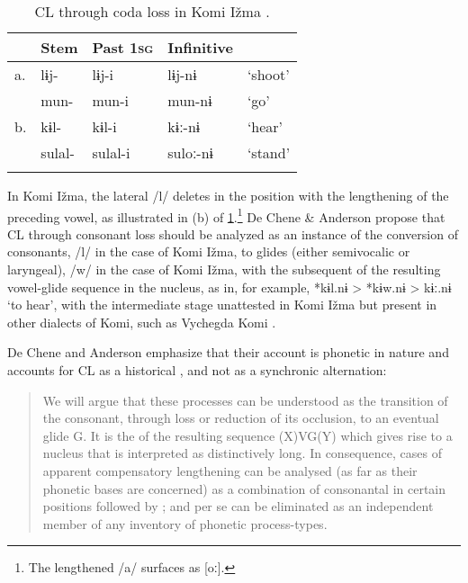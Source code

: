\documentclass[output=paper,
modfonts
]{LSP/langsci}
\begin{document}
\begin{table}
\begin{tabular}{lllll}
	\lsptoprule
	&  Stem & Past \textsc{1sg} & Infinitive & \\
	\midrule
	a. & lɨj- & lɨj-i & lɨj-nɨ & `shoot' \\
	& mun- & mun-i & mun-nɨ & `go' \\
	b. & kɨl- & kɨl-i & kɨː-nɨ & `hear' \\
	& sulal- & sulal-i & suloː-nɨ & `stand'\\
	\lspbottomrule
\end{tabular}
\caption{CL through coda loss in Komi Ižma \citep[after][104]{harms1968}.}
\label{tab:codalosski}
\end{table}

In Komi Ižma, the lateral /l/ deletes in the  position with the
lengthening of the preceding vowel, as illustrated in (b) of \cref{tab:codalosski}.\footnote{The
  lengthened /a/ surfaces as {[}oː{]}.} De Chene \& Anderson \citeyearpar{deChene1979}
propose that CL through consonant loss should be analyzed as an instance
of the conversion of  consonants, /l/ in the case of Komi Ižma, to
glides (either semivocalic or laryngeal), /w/ in the case of Komi Ižma,
with the subsequent  of the resulting vowel-glide
sequence in the  nucleus, as in, for example, *kɨl.nɨ
\textgreater{} *kɨw.nɨ \textgreater{} kɨː.nɨ `to hear', with the
intermediate stage unattested in Komi Ižma but present in other dialects
of Komi, such as Vychegda Komi \citep{lytkin1966,lytkin1976}.

De Chene and Anderson \citeyearpar[508]{deChene1979} emphasize that their account is
phonetic in nature and accounts for CL as a historical , and
not as a synchronic alternation:

\begin{quote}
We will argue that these processes can be understood as the transition
of the consonant, through loss or reduction of its occlusion, to an
eventual glide G. It is the  of the resulting sequence
(X)VG(Y) which gives rise to a  nucleus that is interpreted as
distinctively long. In consequence, cases of apparent compensatory
lengthening can be analysed (as far as their phonetic bases are
concerned) as a combination of consonantal  in certain
positions followed by ; and 
per se can be eliminated as an independent member of any inventory of
phonetic process-types.
\end{quote}
\end{document}
